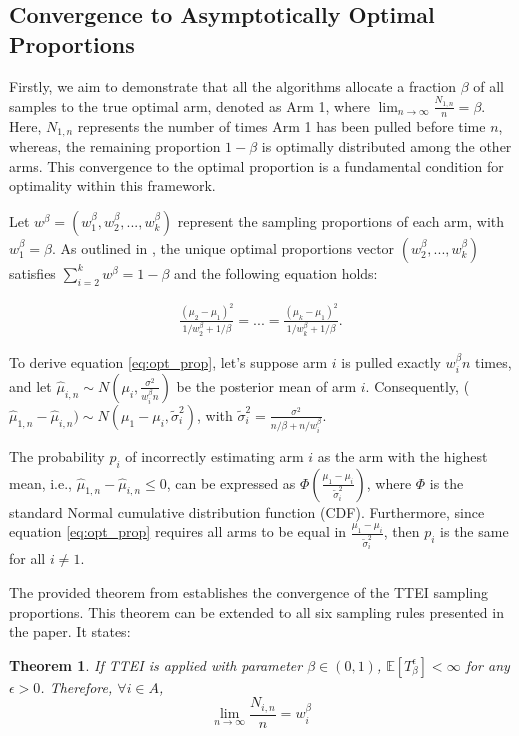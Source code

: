\documentclass[a4paper, 12pt]{article}
\newtheorem{theorem}{Theorem}[section]
\theoremstyle{definition}
\begin{document}
\subsection{Convergence to Asymptotically Optimal Proportions}
Firstly, we aim to demonstrate that all the algorithms allocate a fraction $\beta$ of all samples to the true optimal arm, denoted as Arm 1, where $\lim_{n\to\infty}\frac{N_{1,n}}{n} = \beta$. Here, $N_{1,n}$ represents the number of times Arm 1 has been pulled before time $n$, whereas, the remaining proportion $1-\beta$ is optimally distributed among the other arms. This convergence to the optimal proportion is a fundamental condition for optimality within this framework.

Let $w^\beta = (w_1^\beta, w_2^\beta,... , w_k^\beta)$ represent the sampling proportions of each arm, with $w_1^\beta = \beta$. As outlined in \cite{ttei}, the unique optimal proportions vector $(w_2^\beta,... , w_k^\beta)$ satisfies $\sum_{i=2}^{k} w^\beta = 1-\beta$ and the following equation holds:

\begin{align} \label{eq:opt_prop}
\frac{(\mu_2-\mu_1)^2}{1/w_2^\beta + 1/\beta} =... = \frac{(\mu_k-\mu_1)^2}{1/w_k^\beta + 1/\beta}.
\end{align}

To derive equation \eqref{eq:opt_prop}, let's suppose arm $i$ is pulled exactly $w_i^\beta n$ times, and let $\hat{\mu}_{i,n} \sim N\left(\mu_i,\frac{\sigma^2}{w_i^\beta n}\right)$ be the posterior mean of arm $i$. Consequently, ($\hat{\mu}_{1,n} - \hat{\mu}_{i,n}) \sim N(\mu_1-\mu_i, \tilde{\sigma}_i^2)$, with $\tilde{\sigma}_i^2 = \frac{\sigma^2}{n/\beta + n/w_i^\beta}$. 

The probability $p_{i}$ of incorrectly estimating arm $i$ as the arm with the highest mean, i.e., $\hat{\mu}_{1,n} - \hat{\mu}_{i,n} \leq 0$, can be expressed as $\Phi\left(\frac{\mu_1-\mu_i}{\tilde{\sigma}_i^2}\right)$, where $\Phi$ is the standard Normal cumulative distribution function (CDF). Furthermore, since equation \eqref{eq:opt_prop} requires all arms to be equal in $\frac{\mu_1-\mu_i}{\tilde{\sigma}_i^2}$, then $p_{i}$ is the same for all $i\neq 1$.

The provided theorem from \cite{ttei} establishes the convergence of the TTEI sampling proportions. This theorem can be extended to all six sampling rules presented in the paper. It states:
\begin{theorem}
If TTEI is applied with parameter $\beta \in (0, 1)$, $\mathbb{E}[T_\beta^	\epsilon] < \infty$ for any $\epsilon > 0$. Therefore, $\forall i\in A$,
\[
\lim_{n\to\infty}\frac{N_{i,n}}{n} = w_i^\beta  
\]
\end{theorem}
\end{document}
